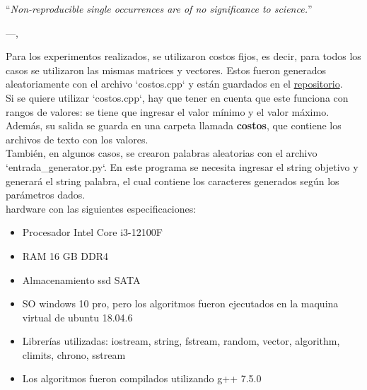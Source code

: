


\epigraph{``\textit{Non-reproducible single occurrences are of no significance to
science.}''}{---\citeauthor{popper2005logic},\citeyear{popper2005logic} \cite{popper2005logic}}


Para los experimentos realizados, se utilizaron costos fijos, es decir, para todos los casos se utilizaron las mismas matrices y vectores. Estos fueron generados aleatoriamente con el archivo `costos.cpp` y están guardados en el \href{https://github.com/Mappo1562/DistanciaMinimaDeEdicionExtendida}{repositorio}. \\
Si se quiere utilizar `costos.cpp`, hay que tener en cuenta que este funciona con rangos de valores: se tiene que ingresar el valor mínimo y el valor máximo. Además, su salida se guarda en una carpeta llamada \textbf{costos}, que contiene los archivos de texto con los valores.\\
También, en algunos casos, se crearon palabras aleatorias con el archivo `entrada\_generator.py`. En este programa se necesita ingresar el string objetivo y generará el string palabra, el cual contiene los caracteres generados según los parámetros dados. \\
hardware con las siguientes especificaciones:

\begin{itemize}
    \item Procesador Intel Core i3-12100F
    \item RAM 16 GB DDR4
    \item Almacenamiento ssd SATA
    \item SO windows 10 pro, pero los algoritmos fueron ejecutados en la maquina virtual de ubuntu 18.04.6
    \item Librerías utilizadas: iostream, string, fstream, random, vector, algorithm, climits, chrono, sstream
    \item Los algoritmos fueron compilados utilizando g++ 7.5.0
\end{itemize}